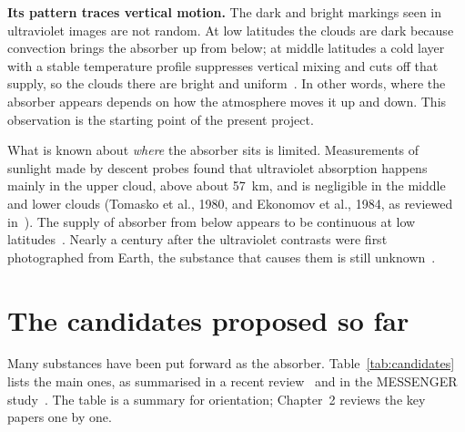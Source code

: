 \textbf{Its pattern traces vertical motion.} The dark and bright markings seen in
ultraviolet images are not random. At low latitudes the clouds are dark because
convection brings the absorber up from below; at middle latitudes a cold layer with a
stable temperature profile suppresses vertical mixing and cuts off that supply, so the
clouds there are bright and uniform~\cite{titov2008}. In other words, where the absorber
appears depends on how the atmosphere moves it up and down. This observation is the
starting point of the present project.

What is known about \emph{where} the absorber sits is limited. Measurements of sunlight
made by descent probes found that ultraviolet absorption happens mainly in the upper
cloud, above about 57~km, and is negligible in the middle and lower clouds (Tomasko et
al., 1980, and Ekonomov et al., 1984, as reviewed in~\cite{dai2025review}). The supply of
absorber from below appears to be continuous at low latitudes~\cite{dai2025review}.
Nearly a century after the ultraviolet contrasts were first photographed from Earth, the
substance that causes them is still unknown~\cite{limaye2018}.

\section{The candidates proposed so far}
\label{sec:candidates}

Many substances have been put forward as the absorber. Table~\ref{tab:candidates} lists
the main ones, as summarised in a recent review~\cite{dai2025review} and in the
MESSENGER study~\cite{perezhoyos2018}. The table is a summary for orientation; Chapter~2
reviews the key papers one by one.


